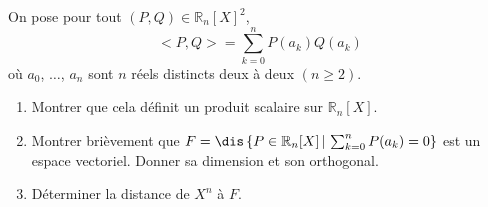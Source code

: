 \documentclass[a4paper,10pt]{report}
\begin{document}
\begin{Exercice}{} On pose pour tout $(P,Q) \in \mathbb{R}_n[X]^2$,
$$ <P,Q> = \sum_{k=0}^n P(a_k) Q(a_k)$$
où $a_0$, $\ldots$, $a_n$ sont $n$ réels distincts deux à deux $(n \geq 2)$.
\begin{enumerate}
\item Montrer que cela définit un produit scalaire sur $\mathbb{R}_n[X]$.
\item Montrer brièvement que $F= \dis \left\lbrace P \in \mathbb{R}_n[X] \, \vert \, \sum_{k=0}^n P(a_k)=0 \right\rbrace$ est un espace vectoriel. Donner sa dimension et son orthogonal.
\item Déterminer la distance de $X^n$ à $F$.
\end{enumerate}
\end{Exercice}

%
%
\end{document}
